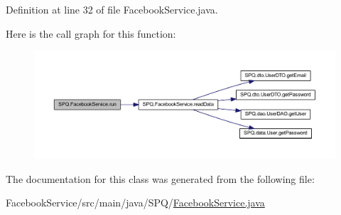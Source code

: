 Definition at line 32 of file Facebook\+Service.\+java.

Here is the call graph for this function\+:\nopagebreak
\begin{figure}[H]
\begin{center}
\leavevmode
\includegraphics[width=350pt]{class_s_p_q_1_1_facebook_service_a24a62bc6a32966419548314bc417abfb_cgraph}
\end{center}
\end{figure}


The documentation for this class was generated from the following file\+:\begin{DoxyCompactItemize}
\item 
Facebook\+Service/src/main/java/\+S\+P\+Q/\mbox{\hyperlink{_facebook_service_8java}{Facebook\+Service.\+java}}\end{DoxyCompactItemize}
